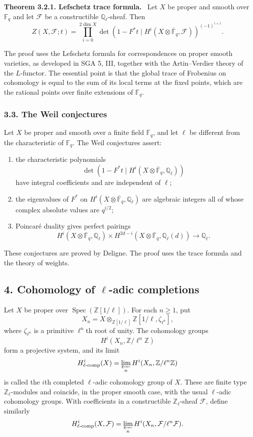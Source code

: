 \documentclass[12pt]{article}
\newcommand{\bZ}{\mathbb Z}
\newcommand{\bQ}{\mathbb Q}
\newcommand{\bF}{\mathbb F}
\newcommand{\cF}{\mathcal F}
\newcommand{\Spec}{\operatorname{Spec}}
\newenvironment{statement}[1]{\par\medskip\noindent\textbf{#1.}\ }{\par\medskip}
\begin{document}
\begin{statement}{Theorem 3.2.1. Lefschetz trace formula}
Let $X$ be proper and smooth over $\bF_q$ and let $\cF$ be a constructible
$\bQ_\ell$-sheaf. Then
\[
Z(X,\cF;t)=\prod_{i=0}^{2\dim X}
\det(1-F^*t\mid H^i(X\otimes\overline{\bF}_q,\cF))^{(-1)^{i+1}}.
\]
\end{statement}

The proof uses the Lefschetz formula for correspondences on proper smooth varieties,
as developed in SGA 5, III, together with the Artin--Verdier theory of the
$L$-functor. The essential point is that the global trace of Frobenius on
cohomology is equal to the sum of its local terms at the fixed points, which are the
rational points over finite extensions of $\bF_q$.

\subsubsection*{3.3. The Weil conjectures}

Let $X$ be proper and smooth over a finite field $\bF_q$, and let $\ell$ be different
from the characteristic of $\bF_q$. The Weil conjectures assert:
\begin{enumerate}[label=(\roman*)]
\item the characteristic polynomials
\[
   \det(1-F^*t\mid H^i(X\otimes\overline{\bF}_q,\bQ_\ell))
\]
have integral coefficients and are independent of $\ell$;
\item the eigenvalues of $F^*$ on $H^i(X\otimes\overline{\bF}_q,\bQ_\ell)$ are
algebraic integers all of whose complex absolute values are $q^{i/2}$;
\item Poincaré duality gives perfect pairings
\[
H^i(X\otimes\overline{\bF}_q,\bQ_\ell)\times
H^{2d-i}(X\otimes\overline{\bF}_q,\bQ_\ell(d))\longrightarrow \bQ_\ell.
\]
\end{enumerate}
These conjectures are proved by Deligne. The proof uses the trace formula and the
theory of weights.

\subsection*{4. Cohomology of $\ell$-adic completions}

Let $X$ be proper over $\Spec(\bZ[1/\ell])$. For each $n\ge1$, put
\[
      X_n=X\otimes_{\bZ[1/\ell]}\bZ[1/\ell,\zeta_{\ell^n}],
\]
where $\zeta_{\ell^n}$ is a primitive $\ell^n$th root of unity. The cohomology groups
\[
      H^i(X_n,\bZ/\ell^n\bZ)
\]
form a projective system, and its limit
\[
      H^i_{\ell\text{-}\mathrm{comp}}(X)=
      \varprojlim_n H^i(X_n,\bZ/\ell^n\bZ)
\]
is called the $i$th completed $\ell$-adic cohomology group of $X$. These are finite
type $\bZ_\ell$-modules and coincide, in the proper smooth case, with the usual
$\ell$-adic cohomology groups. With coefficients in a constructible
$\bZ_\ell$-sheaf $\cF$, define similarly
\[
      H^i_{\ell\text{-}\mathrm{comp}}(X,\cF)=
      \varprojlim_n H^i(X_n,\cF/\ell^n\cF).
\]
\end{document}
